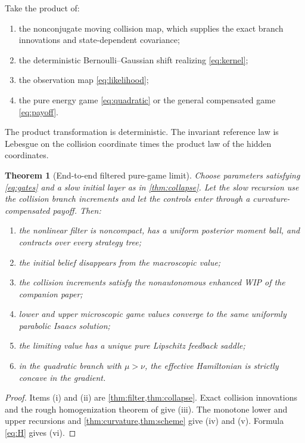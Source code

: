 \documentclass[11pt,reqno]{amsart}
\newtheorem{theorem}{Theorem}[section]
\theoremstyle{definition}
\theoremstyle{remark}
\begin{document}
Take the product of:
\begin{enumerate}[label=(\roman*)]
\item the nonconjugate moving collision map, which supplies the exact branch
innovations and state-dependent covariance;
\item the deterministic Bernoulli--Gaussian shift realizing
\eqref{eq:kernel};
\item the observation map \eqref{eq:likelihood};
\item the pure energy game \eqref{eq:quadratic} or the general compensated
game \eqref{eq:payoff}.
\end{enumerate}
The product transformation is deterministic.  The invariant reference law is
Lebesgue on the collision coordinate times the product law of the hidden
coordinates.

\begin{theorem}[End-to-end filtered pure-game limit]\label{thm:endtoend}
Choose parameters satisfying \eqref{eq:gates} and a slow initial layer as in
\cref{thm:collapse}.  Let the slow recursion use the collision branch
increments and let the controls enter through a curvature-compensated payoff.
Then:
\begin{enumerate}[label=(\roman*)]
\item the nonlinear filter is noncompact, has a uniform posterior moment ball,
and contracts over every strategy tree;
\item the initial belief disappears from the macroscopic value;
\item the collision increments satisfy the nonautonomous enhanced WIP of the
companion paper;
\item lower and upper microscopic game values converge to the same uniformly
parabolic Isaacs solution;
\item the limiting value has a unique pure Lipschitz feedback saddle;
\item in the quadratic branch with $\mu>\nu$, the effective Hamiltonian is
strictly concave in the gradient.
\end{enumerate}
\end{theorem}

\begin{proof}
Items (i) and (ii) are \cref{thm:filter,thm:collapse}.  Exact collision
innovations and the rough homogenization theorem of \cite{QiRoughRound4} give
(iii).  The monotone lower and upper recursions and
\cref{thm:curvature,thm:scheme} give (iv) and (v).  Formula \eqref{eq:H} gives
(vi).
\end{proof}
\end{document}
